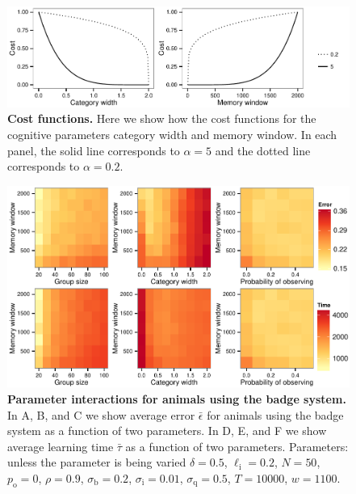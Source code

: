 \begin{figure}[h]
\includegraphics[width=.8\textwidth]{figures/cost_functions.pdf}
\caption{\sffamily\small\textbf{Cost functions.} Here we show how the cost functions for the cognitive parameters category width and memory window. In each panel, the solid line corresponds to $\alpha=5$ and the dotted line corresponds to $\alpha=0.2$. }
\label{cost_fx}
\end{figure}

\begin{figure}[h]
\includegraphics[width=.8\textwidth]{figures/parameter_interactions_badge.pdf}
\caption{\sffamily\small\textbf{Parameter interactions for animals using the badge system.}
In A, B, and C we show average error $\bar{\epsilon}$ for animals using the badge system as a function of two parameters. In D, E, and F we show average learning time $\bar{\tau}$ as a function of two parameters. Parameters: unless the parameter is being varied $\delta = 0.5$, $\ell_\text{i}=0.2$, $N=50$, $p_\text{o}=0$, $\rho=0.9$, $\sigma_\text{b}=0.2$, $\sigma_\text{i}=0.01$, $\sigma_\text{q}=0.5$, $T=10000$, $w=1100$.}
\label{interactions_badge}
\end{figure}

